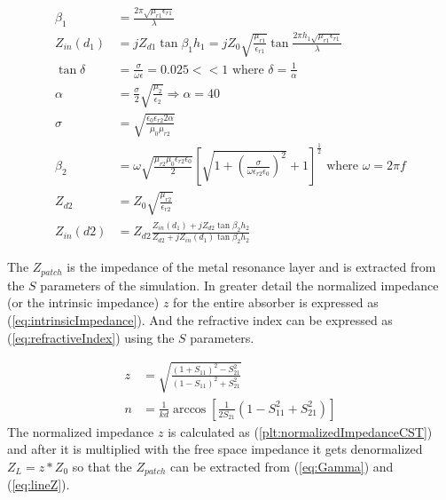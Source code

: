        \begin{subequations}
            \label{eq:Zin}
            \begin{align}
                \beta_1 & = \frac{2\pi\sqrt{\mu_{r1}\epsilon_{r1}}}{\lambda} \label{eq:beta_1} \\
                Z_{in}(d_1) & = jZ_{d1}\tan{\beta_1h_1} = jZ_0\sqrt{\frac{\mu_{r1}}{\epsilon_{r1}}}
                        \tan{\frac{2\pi h_1\sqrt{\mu_{r1}\epsilon_{r1}}}{\lambda}} \label{eq:Zin_d1} \\
                \tan{\delta} & = \frac{\sigma}{\omega\epsilon} = 0.025 << 1
                    \textrm{ where } \delta = \frac{1}{\alpha} \label{eq:lossTangent} \\
                \alpha & = \frac{\sigma}{2}\sqrt{\frac{\mu_2}{\epsilon_2}} \Rightarrow \alpha = 40 \label{eq:alpha} \\
                \sigma & = \sqrt{\frac{\epsilon_0\epsilon_{r2}2\alpha}{\mu_0\mu_{r2}}} \label{eq:sigma} \\
                \beta_2 & = \omega\sqrt{\frac{\mu_{r2}\mu_0\epsilon_{r2}\epsilon_0}{2}}
                    \left[
                        \sqrt{1+\left(\frac{\sigma}{\omega\epsilon_{r2}\epsilon_0}\right)^2}+1
                    \right]^\frac{1}{2} \textrm{ where } \omega = 2\pi f \label{eq:beta_2} \\
                Z_{d2} & = Z_0\sqrt{\frac{\mu_{r2}}{\epsilon_{r2}}} \label{eq:Zd2} \\
                Z_{in}(d2) & = Z_{d2}\frac{Z_{in}(d_1)+jZ_{d2}\tan{\beta_2h_2}}
                    {Z_{d2}+jZ_{in}(d_1)\tan{\beta_2h_2}} \label{eq:Zin_d2}
            \end{align} 
        \end{subequations}

        The $Z_{patch}$ is the impedance of the metal resonance layer and is 
        extracted from the $S$ parameters of the simulation. In greater detail 
        the normalized impedance (or the intrinsic impedance) $z$ for the entire 
        absorber is expressed as (\ref{eq:intrinsicImpedance}). And the 
        refractive index can be expressed as (\ref{eq:refractiveIndex}) using
        the $S$ parameters.

        \begin{subequations}
            \label{eq:Impedance}
            \begin{align}
                z & = \sqrt{\frac{(1 + S_{11})^2 - S_{21}^2}{(1 - S_{11})^2 + S_{21}^2}} \label{eq:intrinsicImpedance} \\
                n & = \frac{1}{kd}\arccos{\left[\frac{1}{2S_{21}}(1-S_{11}^2+S_{21}^2)\right]} \label{eq:refractiveIndex}
            \end{align}
        \end{subequations}
        The normalized impedance $z$ is calculated as 
        (\ref{plt:normalizedImpedanceCST}) and after it is multiplied
        with the free space impedance it gets denormalized $Z_L = z*Z_0$ so
        that the $Z_{patch}$ can be extracted from (\ref{eq:Gamma}) and (\ref{eq:lineZ}).
        
